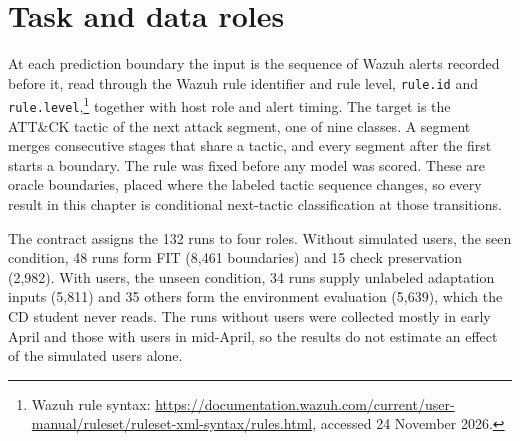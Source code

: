 \section{Task and data roles}
\label{sec:ads24-task}

At each prediction boundary the input is the sequence of Wazuh alerts
recorded before it, read through the Wazuh rule identifier and rule
level, \texttt{rule.id} and
\texttt{rule.level},\footnote{Wazuh rule syntax:
\url{https://documentation.wazuh.com/current/user-manual/ruleset/ruleset-xml-syntax/rules.html},
accessed 24 November 2026.}
together with host role and alert timing. The target is the ATT\&CK tactic of the next attack segment, one
of nine classes. A segment merges consecutive stages that share a
tactic, and every segment after the first starts a boundary. The rule was fixed before any model was scored. These are oracle
boundaries, placed where the labeled tactic sequence changes, so every
result in this chapter is conditional next-tactic classification at
those transitions.

The contract assigns the 132 runs to four roles. Without simulated
users, the seen condition, 48 runs form FIT (8,461 boundaries) and 15
check preservation (2,982). With users, the unseen condition, 34 runs
supply unlabeled adaptation inputs (5,811) and 35 others form the
environment evaluation (5,639), which the CD student never reads. The runs without users were
collected mostly in early April and those with users in mid-April, so
the results do not estimate an effect of the simulated users alone.

